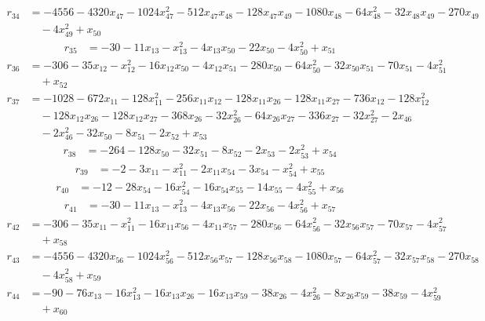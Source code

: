 \begin{align*}
r_{34}&=
-4556-4320x_{47}-1024x_{47}^{2}-512x_{47}x_{48}-128x_{47}x_{49}-1080x_{48}-64x_{48}^{2}-32x_{48}x_{49}-270x_{49} \\
&\quad -4x_{49}^{2}+x_{50}
\end{align*}
\begin{align*}
r_{35}&=
-30-11x_{13}-x_{13}^{2}-4x_{13}x_{50}-22x_{50}-4x_{50}^{2}+x_{51}
\end{align*}
\begin{align*}
r_{36}&=
-306-35x_{12}-x_{12}^{2}-16x_{12}x_{50}-4x_{12}x_{51}-280x_{50}-64x_{50}^{2}-32x_{50}x_{51}-70x_{51}-4x_{51}^{2} \\
&\quad +x_{52}
\end{align*}
\begin{align*}
r_{37}&=
-1028-672x_{11}-128x_{11}^{2}-256x_{11}x_{12}-128x_{11}x_{26}-128x_{11}x_{27}-736x_{12}-128x_{12}^{2} \\
&\quad -128x_{12}x_{26}-128x_{12}x_{27}-368x_{26}-32x_{26}^{2}-64x_{26}x_{27}-336x_{27}-32x_{27}^{2}-2x_{46} \\
&\quad -2x_{46}^{2}-32x_{50}-8x_{51}-2x_{52}+x_{53}
\end{align*}
\begin{align*}
r_{38}&=
-264-128x_{50}-32x_{51}-8x_{52}-2x_{53}-2x_{53}^{2}+x_{54}
\end{align*}
\begin{align*}
r_{39}&=
-2-3x_{11}-x_{11}^{2}-2x_{11}x_{54}-3x_{54}-x_{54}^{2}+x_{55}
\end{align*}
\begin{align*}
r_{40}&=
-12-28x_{54}-16x_{54}^{2}-16x_{54}x_{55}-14x_{55}-4x_{55}^{2}+x_{56}
\end{align*}
\begin{align*}
r_{41}&=
-30-11x_{13}-x_{13}^{2}-4x_{13}x_{56}-22x_{56}-4x_{56}^{2}+x_{57}
\end{align*}
\begin{align*}
r_{42}&=
-306-35x_{11}-x_{11}^{2}-16x_{11}x_{56}-4x_{11}x_{57}-280x_{56}-64x_{56}^{2}-32x_{56}x_{57}-70x_{57}-4x_{57}^{2} \\
&\quad +x_{58}
\end{align*}
\begin{align*}
r_{43}&=
-4556-4320x_{56}-1024x_{56}^{2}-512x_{56}x_{57}-128x_{56}x_{58}-1080x_{57}-64x_{57}^{2}-32x_{57}x_{58}-270x_{58} \\
&\quad -4x_{58}^{2}+x_{59}
\end{align*}
\begin{align*}
r_{44}&=
-90-76x_{13}-16x_{13}^{2}-16x_{13}x_{26}-16x_{13}x_{59}-38x_{26}-4x_{26}^{2}-8x_{26}x_{59}-38x_{59}-4x_{59}^{2} \\
&\quad +x_{60}
\end{align*}
